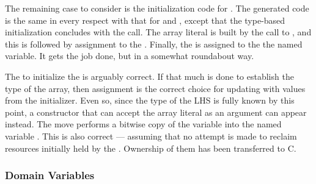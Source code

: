 The remaining case to consider is the initialization code for .  The generated
code is the same in every respect with that for  and , except that the
type-based initialization concludes with the  call.  The array literal is built by
the call to , and this is followed by assignment to the
.  Finally, the  is assigned to the the named variable.  It
gets the job done, but in a somewhat roundabout way.

The  to initialize the  is arguably correct.
If that much is done to establish the type of the array, then assignment is the correct
choice for updating with values from the initializer.  Even so, since the type of the LHS
is fully known by this point, a constructor that can accept the array literal as an
argument can appear instead.  The move performs a bitwise copy of the 
variable into the named variable .  This is also correct --- assuming that no
attempt is made to reclaim resources initially held by the .  Ownership of
them has been transferred to C.

\subsubsection{Domain Variables}

